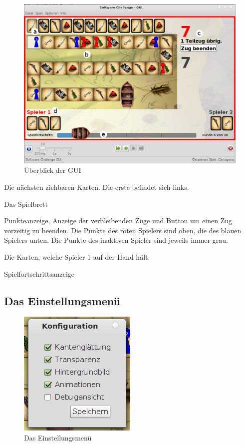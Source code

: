 \documentclass[a4paper, ngerman]{scrartcl}
\begin{document}
	 \begin{figure}[h!]
		\centering		
		\includegraphics[scale = 0.3]{bilder/gui}
		\caption{Überblick der GUI}
		\label{fig:GUI}
	\end{figure}
	
	\begin{compactenum}[a)]
		\item Die nächsten ziehbaren Karten. Die erste befindet sich links.
		\item Das Spielbrett
		\item Punkteanzeige, Anzeige der verbleibenden Züge und Button um einen Zug
		vorzeitig zu beenden. Die Punkte des roten Spielers sind oben, die des blauen
		Spielers unten. Die Punkte des inaktiven Spieler sind jeweils immer grau.
		\item Die Karten, welche Spieler 1 auf der Hand hält.
		\item Spielfortschrittsanzeige
	\end{compactenum}
	
\subsection{Das Einstellungsmenü}
	 \begin{figure}[h]
		\centering
		\includegraphics[scale=0.5]{bilder/configuration}
		\caption{Das Einstellungsmenü}
		\label{fig:Configuration}
	\end{figure}
	
\end{document}
